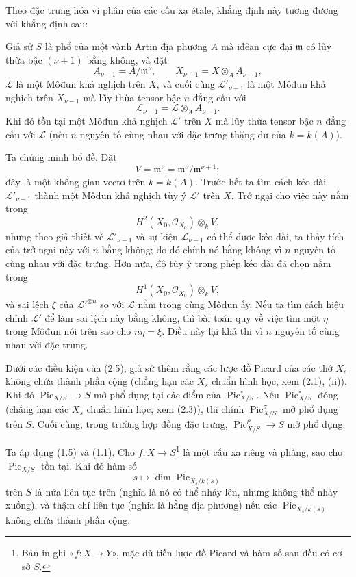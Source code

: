 Theo đặc trưng hóa vi phân của các cấu xạ étale, khẳng định này tương đương với
khẳng định sau:

 Giả sử $S$ là phổ của một vành Artin địa phương $A$ mà
iđêan cực đại $\mathfrak m$ có lũy thừa bậc $(\nu+1)$ bằng không, và đặt
\[
A_{\nu-1}=A/\mathfrak m^\nu,
\qquad X_{\nu-1}=X\otimes_A A_{\nu-1},
\]
$\mathcal L$ là một Môđun khả nghịch trên $X$, và cuối cùng
$\mathcal L'_{\nu-1}$ là một Môđun khả nghịch trên $X_{\nu-1}$ mà lũy thừa
tensor bậc $n$ đẳng cấu với
\[
\mathcal L_{\nu-1}=\mathcal L\otimes_A A_{\nu-1}.
\]
Khi đó tồn tại một Môđun khả nghịch $\mathcal L'$ trên $X$ mà lũy thừa tensor
bậc $n$ đẳng cấu với $\mathcal L$ (nếu $n$ nguyên tố cùng nhau với đặc trưng
thặng dư của $k=k(A)$).

Ta chứng minh bổ đề. Đặt
\[
V=\mathfrak m^\nu=\mathfrak m^\nu/\mathfrak m^{\nu+1} ;
\]
đây là một không gian vectơ trên $k=k(A)$. Trước hết ta tìm cách kéo dài
$\mathcal L'_{\nu-1}$ thành một Môđun khả nghịch tùy ý $\mathcal L'$ trên
$X$. Trở ngại cho việc này nằm trong
\[
H^2(X_0,\mathcal O_{X_0})\otimes_k V,
\]
nhưng theo giả thiết về $\mathcal L'_{\nu-1}$ và sự kiện
$\mathcal L_{\nu-1}$ có thể được kéo dài, ta thấy tích của trở ngại này với
$n$ bằng không; do đó chính nó bằng không vì $n$ nguyên tố cùng nhau với đặc
trưng. Hơn nữa, độ tùy ý trong phép kéo dài đã chọn nằm trong
\[
H^1(X_0,\mathcal O_{X_0})\otimes_k V,
\]
và sai lệch $\xi$ của $\mathcal L'^{\otimes n}$ so với $\mathcal L$ nằm trong
cùng Môđun ấy. Nếu ta tìm cách hiệu chỉnh $\mathcal L'$ để làm sai lệch này
bằng không, thì bài toán quy về việc tìm một $\eta$ trong Môđun nói trên sao
cho $n\eta=\xi$. Điều này lại khả thi vì $n$ nguyên tố cùng nhau với đặc
trưng.

 Dưới các điều kiện của (2.5), giả sử thêm rằng các lược đồ
Picard của các thớ $X_s$ không chứa thành phần cộng (chẳng hạn các $X_s$ chuẩn
hình học, xem (2.1), (ii)). Khi đó
$\operatorname{Pic}_{X/S}\longrightarrow S$ mở phổ dụng tại các điểm của
$\operatorname{Pic}_{X/S}^\circ$. Nếu $\operatorname{Pic}_{X/S}^\circ$ đóng
(chẳng hạn các $X_s$ chuẩn hình học, xem (2.3)), thì chính
$\operatorname{Pic}_{X/S}^\sigma$ mở phổ dụng trên $S$. Cuối cùng, trong
trường hợp đồng đặc trưng, $\operatorname{Pic}_{X/S}^\rho\longrightarrow S$
mở phổ dụng.

Ta áp dụng (1.5) và (1.1).
 Cho $f:X\longrightarrow S$\footnote{Bản in ghi
«$f:X\longrightarrow Y$», mặc dù tiền lược đồ Picard và hàm số sau đều có cơ
sở $S$.} là một cấu xạ riêng và phẳng, sao cho $\operatorname{Pic}_{X/S}$ tồn
tại. Khi đó hàm số
\[
s\longmapsto\dim\operatorname{Pic}_{X_s/k(s)}
\]
trên $S$ là nửa liên tục trên (nghĩa là nó có thể nhảy lên, nhưng không thể
nhảy xuống), và thậm chí liên tục (nghĩa là hằng địa phương) nếu các
$\operatorname{Pic}_{X_s/k(s)}$ không chứa thành phần cộng.

